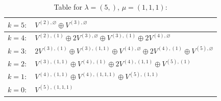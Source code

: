 \documentclass[a4paper,12pt]{article}
\begin{document}
\renewcommand{\arraystretch}{1.6} 
\begin{table}[H]
\centering
\caption{Table for $\lambda = (5,)$, $\mu = (1, 1, 1)$:}
\begin{tabular}{|>{\centering\arraybackslash}p{15cm}|}
\hline
 $k = 5: \quad V^{(2), \varnothing} \oplus V^{(3), \varnothing} $ \\ \hline
 $k = 4: \quad V^{(2), (1)} \oplus 2 V^{(3), \varnothing} \oplus V^{(3), (1)} \oplus 2 V^{(4), \varnothing} $ \\ \hline
 $k = 3: \quad 2 V^{(3), (1)} \oplus V^{(3), (1, 1)} \oplus V^{(4), \varnothing} \oplus 2 V^{(4), (1)} \oplus V^{(5), \varnothing} $ \\ \hline
 $k = 2: \quad V^{(3), (1, 1)} \oplus V^{(4), (1)} \oplus 2 V^{(4), (1, 1)} \oplus V^{(5), (1)} $ \\ \hline
 $k = 1: \quad V^{(4), (1, 1)} \oplus V^{(4), (1, 1, 1)} \oplus V^{(5), (1, 1)} $ \\ \hline
 $k = 0: \quad V^{(5), (1, 1, 1)} $ \\ \hline
\end{tabular}
\end{table}
\end{document}
